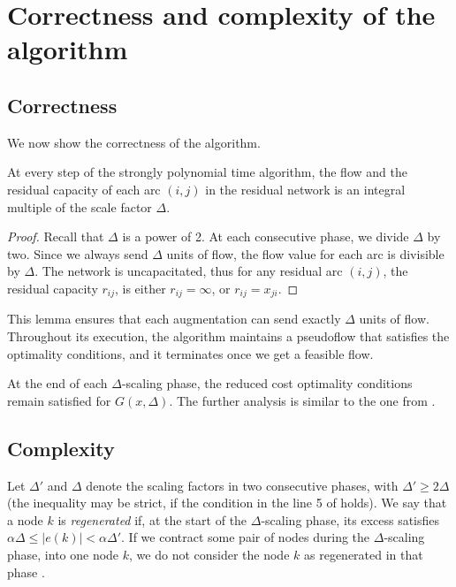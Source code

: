 \section{Correctness and complexity of the algorithm}

\subsection{Correctness}
We now show the correctness of the algorithm.

\begin{lemma}\label{lem:integral_multiple}
    At every step of the strongly polynomial time algorithm, the flow and the residual capacity of each arc $(i,j)$ in the residual network is an integral multiple of the scale factor $\Delta$.
\end{lemma}

\begin{proof}
    Recall that $\Delta$ is a power of 2. At each consecutive phase, we divide $\Delta$ by two. Since we always send $\Delta$ units of flow, the flow value for each arc is divisible by $\Delta$. The network is uncapacitated, thus for any residual arc $(i,j)$, the residual capacity $r_{ij}$, is either $r_{ij} = \infty$, or $r_{ij} = x_{ji}$.  
\end{proof}

This lemma ensures that each augmentation can send exactly $\Delta$ units of flow. Throughout its execution, the algorithm maintains a pseudoflow that satisfies the optimality conditions, and it terminates once we get a feasible flow.

At the end of each $\Delta$-scaling phase, the reduced cost optimality conditions remain satisfied for $G(x, \Delta)$. The further analysis is similar to the one from . 

\subsection{Complexity}

Let $\Delta'$ and $\Delta$ denote the scaling factors in two consecutive phases, with $\Delta' \geq 2\Delta$ (the inequality may be strict, if the condition in the line 5 of  holds). We say that a node $k$ is \emph{regenerated} if, at the start of the $\Delta$-scaling phase, its excess satisfies $\alpha\Delta \leq |e(k)| < \alpha\Delta'$. If we contract some pair of nodes during the $\Delta$-scaling phase, into one node $k$, we do not consider the node $k$ as regenerated in that phase \cite{orlin1993faster}.

